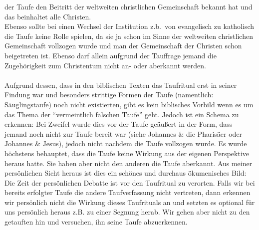 der Taufe den Beitritt der weltweiten christlichen Gemeinschaft bekannt hat und das beinhaltet alle Christen.
\\
Ebenso sollte bei einen Wechsel der Institution z.b.\ von evangelisch zu katholisch die Taufe keine Rolle spielen, da sie ja schon im Sinne der weltweiten christlichen Gemeinschaft vollzogen wurde
und man der Gemeinschaft der Christen schon beigetreten ist. Ebenso darf allein aufgrund der Tauffrage jemand die Zugehörigkeit zum Christentum nicht an- oder aberkannt werden.
\\~\\
Aufgrund dessen, dass in den biblischen Texten das Taufritual erst in seiner Findung war und besonders strittige Formen der Taufe (namentlich: Säuglingstaufe) noch nicht existierten, gibt es kein biblisches Vorbild wenn es um das Thema der ``vermeintlich falschen Taufe'' geht. Jedoch ist ein Schema zu erkennen: Bei Zweifel wurde dies vor der Taufe geäußert in der Form, dass jemand noch nicht zur Taufe bereit war (siehe Johannes \& die Pharisäer oder Johannes \& Jesus), jedoch nicht nachdem die Taufe vollzogen wurde. Es wurde höchstens behauptet, dass die Taufe keine Wirkung aus der eigenen Perspektive heraus hatte. Sie haben aber nicht den anderen die Taufe aberkannt. Aus meiner persönlichen Sicht heraus ist dies ein schönes und durchaus ökumenisches Bild: Die Zeit der persönlichen Debatte ist vor den Taufritual zu verorten. Falls wir bei bereits erfolgter Taufe die andere Taufverfassung nicht vertreten, dann erkennen wir persönlich nicht die Wirkung dieses Taufrituals an und setzten es optional für uns persönlich heraus z.B. zu einer Segnung herab. Wir gehen aber nicht zu den getauften hin und versuchen, ihn seine Taufe abzuerkennen.

